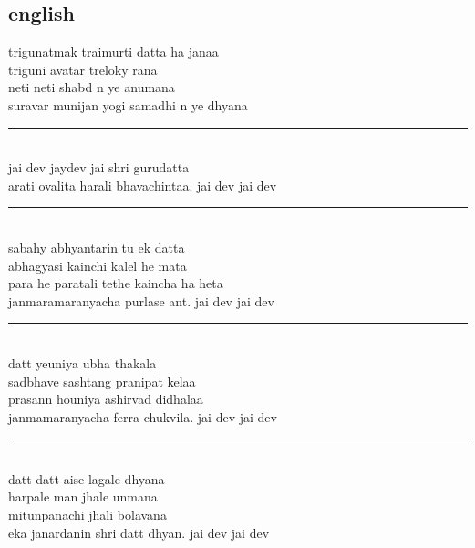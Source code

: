 \documentclass[letterpaper,twocolumn,openany,nodeprecatedcode]{dndbook}
\begin{document}
\begin{flushleft}
  \subsection*{english}
  trigunatmak traimurti datta ha janaa \\ triguni avatar treloky rana \\ neti neti shabd n ye anumana \\ suravar munijan yogi samadhi n ye dhyana \\
  \rule{\linewidth}{1pt} \\
  jai dev jaydev jai shri gurudatta\\ arati ovalita harali bhavachintaa. jai dev jai dev
  \rule{\linewidth}{1pt} \\
  sabahy abhyantarin tu ek datta\\ abhagyasi kainchi kalel he mata\\ para he paratali tethe kaincha ha heta\\ janmaramaranyacha purlase ant. jai dev jai dev
  \rule{\linewidth}{1pt} \\
  datt yeuniya ubha thakala\\ sadbhave sashtang pranipat kelaa\\ prasann houniya ashirvad didhalaa\\ janmamaranyacha ferra chukvila. jai dev jai dev
  \rule{\linewidth}{1pt} \\
  datt datt aise lagale dhyana\\ harpale man jhale unmana \\ mitunpanachi jhali bolavana\\ eka janardanin shri datt dhyan. jai dev jai dev
\end{flushleft}
\pagebreak
\end{document}
